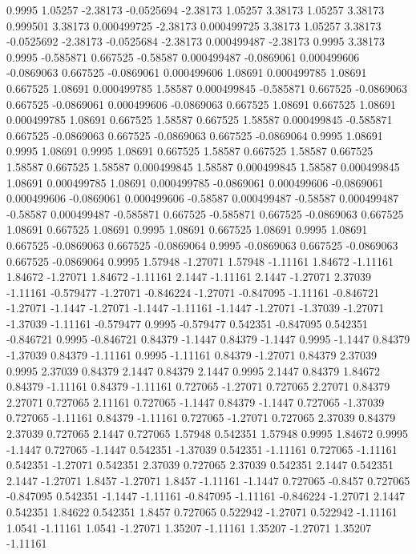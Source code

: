 0.9995 1.05257
-2.38173 -0.0525694
-2.38173 1.05257
3.38173 1.05257
3.38173 0.999501
3.38173 0.000499725
-2.38173 0.000499725
3.38173 1.05257
3.38173 -0.0525692
-2.38173 -0.0525684
-2.38173 0.000499487
-2.38173 0.9995
3.38173 0.9995
-0.585871 0.667525
-0.58587 0.000499487
-0.0869061 0.000499606
-0.0869063 0.667525
-0.0869061 0.000499606
1.08691 0.000499785
1.08691 0.667525
1.08691 0.000499785
1.58587 0.000499845
-0.585871 0.667525
-0.0869063 0.667525
-0.0869061 0.000499606
-0.0869063 0.667525
1.08691 0.667525
1.08691 0.000499785
1.08691 0.667525
1.58587 0.667525
1.58587 0.000499845
-0.585871 0.667525
-0.0869063 0.667525
-0.0869063 0.667525
-0.0869064 0.9995
1.08691 0.9995
1.08691 0.9995
1.08691 0.667525
1.58587 0.667525
1.58587 0.667525
1.58587 0.667525
1.58587 0.000499845
1.58587 0.000499845
1.58587 0.000499845
1.08691 0.000499785
1.08691 0.000499785
-0.0869061 0.000499606
-0.0869061 0.000499606
-0.0869061 0.000499606
-0.58587 0.000499487
-0.58587 0.000499487
-0.58587 0.000499487
-0.585871 0.667525
-0.585871 0.667525
-0.0869063 0.667525
1.08691 0.667525
1.08691 0.9995
1.08691 0.667525
1.08691 0.9995
1.08691 0.667525
-0.0869063 0.667525
-0.0869064 0.9995
-0.0869063 0.667525
-0.0869063 0.667525
-0.0869064 0.9995
1.57948 -1.27071
1.57948 -1.11161
1.84672 -1.11161
1.84672 -1.27071
1.84672 -1.11161
2.1447 -1.11161
2.1447 -1.27071
2.37039 -1.11161
-0.579477 -1.27071
-0.846224 -1.27071
-0.847095 -1.11161
-0.846721 -1.27071
-1.1447 -1.27071
-1.1447 -1.11161
-1.1447 -1.27071
-1.37039 -1.27071
-1.37039 -1.11161
-0.579477 0.9995
-0.579477 0.542351
-0.847095 0.542351
-0.846721 0.9995
-0.846721 0.84379
-1.1447 0.84379
-1.1447 0.9995
-1.1447 0.84379
-1.37039 0.84379
-1.11161 0.9995
-1.11161 0.84379
-1.27071 0.84379
2.37039 0.9995
2.37039 0.84379
2.1447 0.84379
2.1447 0.9995
2.1447 0.84379
1.84672 0.84379
-1.11161 0.84379
-1.11161 0.727065
-1.27071 0.727065
2.27071 0.84379
2.27071 0.727065
2.11161 0.727065
-1.1447 0.84379
-1.1447 0.727065
-1.37039 0.727065
-1.11161 0.84379
-1.11161 0.727065
-1.27071 0.727065
2.37039 0.84379
2.37039 0.727065
2.1447 0.727065
1.57948 0.542351
1.57948 0.9995
1.84672 0.9995
-1.1447 0.727065
-1.1447 0.542351
-1.37039 0.542351
-1.11161 0.727065
-1.11161 0.542351
-1.27071 0.542351
2.37039 0.727065
2.37039 0.542351
2.1447 0.542351
2.1447 -1.27071
1.8457 -1.27071
1.8457 -1.11161
-1.1447 0.727065
-0.8457 0.727065
-0.847095 0.542351
-1.1447 -1.11161
-0.847095 -1.11161
-0.846224 -1.27071
2.1447 0.542351
1.84622 0.542351
1.8457 0.727065
0.522942 -1.27071
0.522942 -1.11161
1.0541 -1.11161
1.0541 -1.27071
1.35207 -1.11161
1.35207 -1.27071
1.35207 -1.11161
